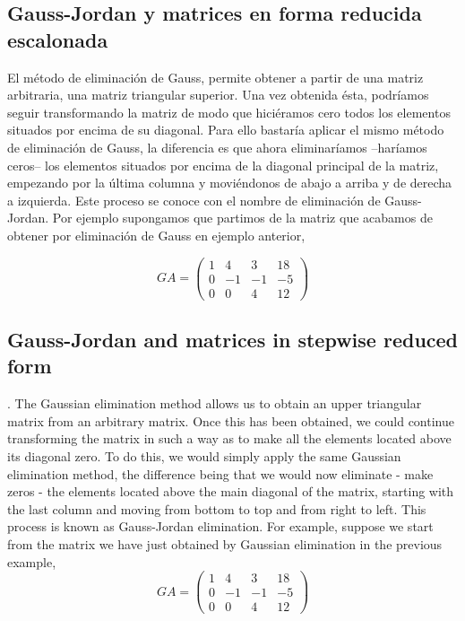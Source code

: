\begin{paracol}{2}
\subsection{Gauss-Jordan  y matrices en forma reducida escalonada}
El método de eliminación de Gauss, permite obtener a partir de una matriz arbitraria, una  matriz triangular superior. Una vez obtenida ésta, podríamos seguir transformando la matriz de modo que hiciéramos cero todos los elementos situados por encima de su diagonal. Para ello bastaría aplicar el mismo método de eliminación de Gauss, la diferencia es que ahora eliminaríamos --haríamos ceros-- los elementos situados por encima de la diagonal principal de la matriz, empezando por la última columna y moviéndonos de abajo a arriba y de derecha a izquierda. Este proceso se conoce con el nombre de eliminación de Gauss-Jordan.
Por ejemplo supongamos que partimos de la matriz que acabamos de obtener por eliminación de Gauss en ejemplo anterior,

\begin{equation*}
GA=\begin{pmatrix}
1&     4&     3&    18\\
 0&    -1&    -1&    -5\\
 0&     0&     4&    12
\end{pmatrix}
\end{equation*}  

\switchcolumn

\subsection{Gauss-Jordan and matrices in stepwise reduced form}.
The Gaussian elimination method allows us to obtain an upper triangular matrix from an arbitrary matrix. Once this has been obtained, we could continue transforming the matrix in such a way as to make all the elements located above its diagonal zero. To do this, we would simply apply the same Gaussian elimination method, the difference being that we would now eliminate - make zeros - the elements located above the main diagonal of the matrix, starting with the last column and moving from bottom to top and from right to left. This process is known as Gauss-Jordan elimination.
For example, suppose we start from the matrix we have just obtained by Gaussian elimination in the previous example,
\begin{equation*}
GA=\begin{pmatrix}
1&     4&     3&    18\\
 0&    -1&    -1&    -5\\
 0&     0&     4&    12
\end{pmatrix}
\end{equation*}  


\end{paracol}
